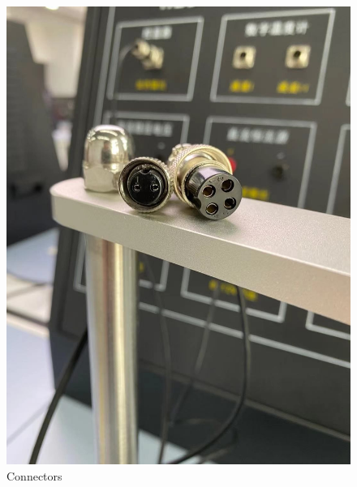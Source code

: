 \documentclass[UTF8]{article}
\begin{document}
     \begin{figure}[H]
     	\begin{minipage}[t]{0.5\linewidth}
     		\centering
     		\includegraphics[clip,scale=0.195,trim={0 4 0 4}]{fig/fig7.jpg}
     		\caption{ Connectors}
     		\label{figure.8}
     	\end{minipage}
     	\begin{minipage}[t]{0.5\linewidth}
     		\centering

\end{minipage}
\end{figure}
\end{document}

